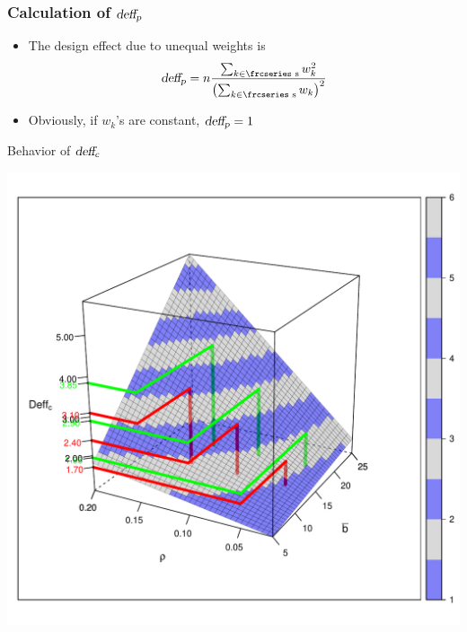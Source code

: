 \documentclass[10pt]{beamer}\usepackage[]{graphicx}\usepackage[]{color}
\newenvironment{knitrout}{}{} %
\newcommand{\textfrc}[1]{{\frcseries#1}}
\newcommand{\mathfrc}[1]{\text{\textfrc{#1}}}
\newcommand{\deffc}{\ensuremath{\text{\slshape deff}_{\text{\slshape c}}}}
\newcommand{\deffp}{\ensuremath{\text{\slshape deff}_{\text{\slshape p}}}}
\begin{document}
\begin{frame}
	\frametitle{Calculation of $\deffp$}
	\begin{itemize}
		\item The design effect due to unequal weights is
					$$
					  \deffp = n \frac{\sum_{k \in \mathfrc{s}} w_k^2} { \left( \sum_{k \in \mathfrc{s}}  w_k \right)^2 }
					$$
		\item Obviously, if $w_k$'s are constant, $\deffp = 1$
	\end{itemize}
\end{frame}

\begin{frame}{Behavior of $\deffc$}
~\\[-1cm]
\begin{knitrout}\footnotesize
{}\color{fgcolor}

{\centering \includegraphics[width=.8\linewidth]{graphs/beamer-deff-illustration-wire-1} 

}



\end{knitrout}
\end{frame}
\end{document}
